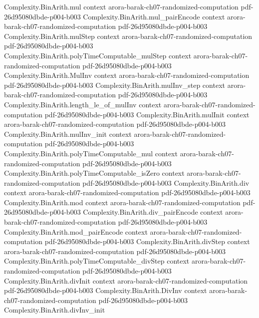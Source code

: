\begin{theorem}
\proofstep
  {Complexity.BinArith.mul}
  {context}
  {arora-barak-ch07-randomized-computation}
  {pdf-26d95080dbde-p004-b003}
\proofstep
  {Complexity.BinArith.mul_pairEncode}
  {context}
  {arora-barak-ch07-randomized-computation}
  {pdf-26d95080dbde-p004-b003}
\proofstep
  {Complexity.BinArith.mulStep}
  {context}
  {arora-barak-ch07-randomized-computation}
  {pdf-26d95080dbde-p004-b003}
\proofstep
  {Complexity.BinArith.polyTimeComputable_mulStep}
  {context}
  {arora-barak-ch07-randomized-computation}
  {pdf-26d95080dbde-p004-b003}
\proofstep
  {Complexity.BinArith.MulInv}
  {context}
  {arora-barak-ch07-randomized-computation}
  {pdf-26d95080dbde-p004-b003}
\proofstep
  {Complexity.BinArith.mulInv_step}
  {context}
  {arora-barak-ch07-randomized-computation}
  {pdf-26d95080dbde-p004-b003}
\proofstep
  {Complexity.BinArith.length_le_of_mulInv}
  {context}
  {arora-barak-ch07-randomized-computation}
  {pdf-26d95080dbde-p004-b003}
\proofstep
  {Complexity.BinArith.mulInit}
  {context}
  {arora-barak-ch07-randomized-computation}
  {pdf-26d95080dbde-p004-b003}
\proofstep
  {Complexity.BinArith.mulInv_init}
  {context}
  {arora-barak-ch07-randomized-computation}
  {pdf-26d95080dbde-p004-b003}
\proofstep
  {Complexity.BinArith.polyTimeComputable_mul}
  {context}
  {arora-barak-ch07-randomized-computation}
  {pdf-26d95080dbde-p004-b003}
\proofstep
  {Complexity.BinArith.polyTimeComputable_isZero}
  {context}
  {arora-barak-ch07-randomized-computation}
  {pdf-26d95080dbde-p004-b003}
\proofstep
  {Complexity.BinArith.div}
  {context}
  {arora-barak-ch07-randomized-computation}
  {pdf-26d95080dbde-p004-b003}
\proofstep
  {Complexity.BinArith.mod}
  {context}
  {arora-barak-ch07-randomized-computation}
  {pdf-26d95080dbde-p004-b003}
\proofstep
  {Complexity.BinArith.div_pairEncode}
  {context}
  {arora-barak-ch07-randomized-computation}
  {pdf-26d95080dbde-p004-b003}
\proofstep
  {Complexity.BinArith.mod_pairEncode}
  {context}
  {arora-barak-ch07-randomized-computation}
  {pdf-26d95080dbde-p004-b003}
\proofstep
  {Complexity.BinArith.divStep}
  {context}
  {arora-barak-ch07-randomized-computation}
  {pdf-26d95080dbde-p004-b003}
\proofstep
  {Complexity.BinArith.polyTimeComputable_divStep}
  {context}
  {arora-barak-ch07-randomized-computation}
  {pdf-26d95080dbde-p004-b003}
\proofstep
  {Complexity.BinArith.divInit}
  {context}
  {arora-barak-ch07-randomized-computation}
  {pdf-26d95080dbde-p004-b003}
\proofstep
  {Complexity.BinArith.DivInv}
  {context}
  {arora-barak-ch07-randomized-computation}
  {pdf-26d95080dbde-p004-b003}
\proofstep
  {Complexity.BinArith.divInv_init}

\end{theorem}
